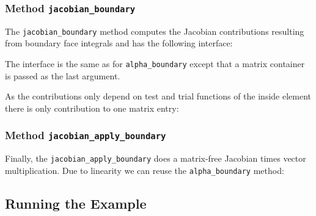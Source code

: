 \documentclass[a4paper,12pt]{article}
\begin{document}
\subsubsection*{Method \lstinline{jacobian_boundary}}

The \lstinline{jacobian_boundary} method computes
the Jacobian contributions resulting from boundary face integrals
and has the following interface:

The interface is the same as for \lstinline{alpha_boundary} except that
a matrix container is passed as the last argument.

As the contributions only depend on test and trial functions
of the inside element there is only contribution to one
matrix entry:


\subsubsection*{Method \lstinline{jacobian_apply_boundary}}

Finally, the \lstinline{jacobian_apply_boundary} does a
matrix-free Jacobian times vector multiplication. Due to linearity
we can reuse the \lstinline{alpha_boundary} method:


\subsection{Running the Example}
\end{document}
